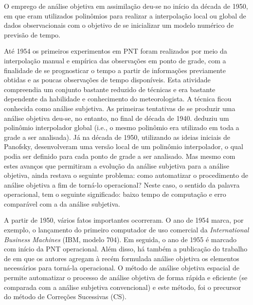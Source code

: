 O emprego de análise objetiva em assimilação deu-se no início da década de 1950, em que eram utilizados polinômios para realizar a interpolação local ou global de dados observacionais com o objetivo de se inicializar um modelo numérico de previsão de tempo. 

Até 1954 os primeiros experimentos em PNT foram realizados por meio da interpolação manual e empírica das observações em ponto de grade, com a finalidade de se prognosticar o tempo a partir de informações previamente obtidas e as poucas observações de tempo disponíveis. Esta atividade compreendia um conjunto bastante reduzido de técnicas e era bastante dependente da habilidade e conhecimento do meteorologista. A técnica ficou conhecida como análise subjetiva. As primeiras tentativas de se produzir uma análise objetiva deu-se, no entanto, no final de década de 1940.  deduziu um polinômio interpolador global (i.e., o mesmo polinômio era utilizado em toda a grade a ser analisada). Já na década de 1950,  utilizando as ideias iniciais de Panofsky, desenvolveram uma versão local de um polinômio interpolador, o qual podia ser definido para cada ponto de grade a ser analisado. Mas mesmo com estes avanços que permitiram a evolução da análise subjetiva para a análise objetiva, ainda restava o seguinte problema: como automatizar o procedimento de análise objetiva a fim de torná-lo operacional? Neste caso, o sentido da palavra operacional, tem o seguinte significado: baixo tempo de computação e erro comparável com a da análise subjetiva.

A partir de 1950, vários fatos importantes ocorreram. O ano de 1954 marca, por exemplo, o lançamento do primeiro computador de uso comercial da \textit{International Business Machines} (IBM, modelo 704). Em seguida, o ano de 1955 é marcado com início da PNT operacional. Além disso, há também a publicação do trabalho de  em que os autores agregam à recém formulada análise objetiva os elementos necessários para torná-la operacional. O método de análise objetiva espacial de  permite automatizar o processo de análise objetiva de forma rápida e eficiente (se comparada com a análise subjetiva convencional) e este método, foi o precursor do método de Correções Sucessivas (CS).

